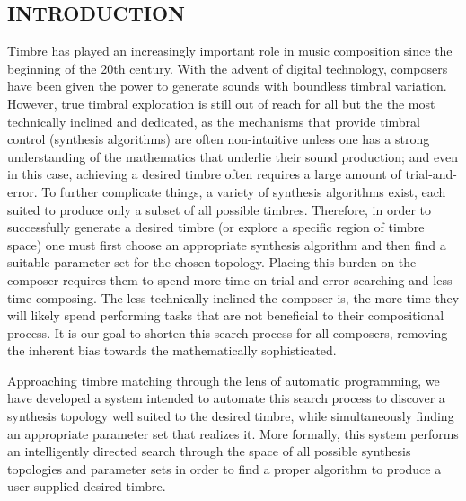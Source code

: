 \documentclass[12pt]{report} 	%
\numberwithin{figure}{chapter}
\numberwithin{table}{chapter}
\numberwithin{equation}{chapter}
\begin{document}
\begin{flushleft}				%
\setlength{\parindent}{30pt}	%

				
\vspace*{\QuarterPage}
\newpage
{}
\chapter{INTRODUCTION} %
Timbre has played an increasingly important role in music composition since the beginning of the 20th century. With the advent of digital technology, composers have been given the power to generate sounds with boundless timbral variation. However, true timbral exploration is still out of reach for all but the the most technically inclined and dedicated, as the mechanisms that provide timbral control (synthesis algorithms) are often non-intuitive unless one has a strong understanding of the mathematics that underlie their sound production; and even in this case, achieving a desired timbre often requires a large amount of trial-and-error. To further complicate things, a variety of synthesis algorithms exist, each suited to produce only a subset of all possible timbres. Therefore, in order to successfully generate a desired timbre (or explore a specific region of timbre space) one must first choose an appropriate synthesis algorithm and then find a suitable parameter set for the chosen topology. Placing this burden on the composer requires them to spend more time on trial-and-error searching and less time composing. The less technically inclined the composer is, the more time they will likely spend performing tasks that are not beneficial to their compositional process. It is our goal to shorten this search process for all composers, removing the inherent bias towards the mathematically sophisticated.

Approaching timbre matching through the lens of automatic programming, we have developed a system intended to automate this search process to discover a synthesis topology well suited to the desired timbre, while simultaneously finding an appropriate parameter set that realizes it. More formally, this system performs an intelligently directed search through the space of all possible synthesis topologies and parameter sets in order to find a proper algorithm to produce a user-supplied desired timbre.


\end{flushleft}
\end{document}
